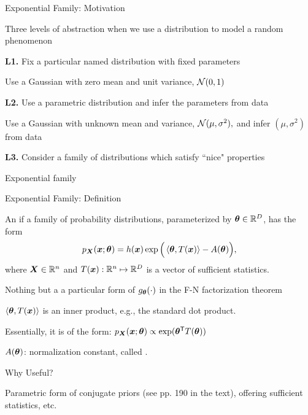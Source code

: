 \documentclass[handout,fleqn,aspectratio=169]{beamer}
\begin{document}
\begin{frame}{Exponential Family: Motivation} 

\plitemsep 0.15in
\bci 
\item Three levels of abstraction when we use a distribution to model a random phenomenon

\item[\bf L1.] Fix a particular named distribution with fixed parameters
\bci
\item \exam Use a Gaussian with zero mean and unit variance, $\mathcal N(0,1)$
\eci
\item[\bf L2.] Use a parametric distribution and infer the parameters from data
\bci
\item \exam Use a Gaussian with unknown mean and variance, $\mathcal N(\mu,\sigma^2),$ and infer $(\mu,\sigma^2)$ from data
\eci

\item[\bf L3.] Consider a family of distributions which satisfy ``nice" properties  

\bci
\item \exam Exponential family
\eci

\eci

\end{frame}

\begin{frame}{Exponential Family: Definition} 

\mycolorbox
{
An  if a family of probability distributions, parameterized by $\bm{\theta} \in {\mathbb R}^D$, has the form
$$
p_{\bm{X}} (\bm{x};\bm{\theta}) = h(\bm{x}) \exp\Big(\left\langle \bm{\theta}, T(\bm{x}) \right\rangle - A(\bm{\theta})\Big),
$$
where $\bm{X} \in {\mathbb R}^{n}$ and $T(\bm{x}): {\mathbb R}^{n} \mapsto {\mathbb R}^{D}$ is a vector of sufficient statistics.
}

\vspace{-0.4cm}
\plitemsep 0.03in
\bci 

\item Nothing but a a particular form of $g_{\bm{\theta}}(\cdot)$ in the F-N factorization theorem
\item $\left\langle \bm{\theta}, T(\bm{x}) \right\rangle$ is an inner product, e.g., the standard dot product. 
\item Essentially, it is of the form: $p_{\bm{X}}(\bm{x};\bm{\theta}) \propto \exp({\bm{\theta}}^{\mathsf{T}}T(\bm{\theta}))$
\item $A(\bm{\theta})$: normalization constant, called .


\item Why Useful?
\bci
\item Parametric form of conjugate priors (see pp. 190 in the text), offering sufficient statistics, etc.
\eci
\eci

\end{frame}
\end{document}
